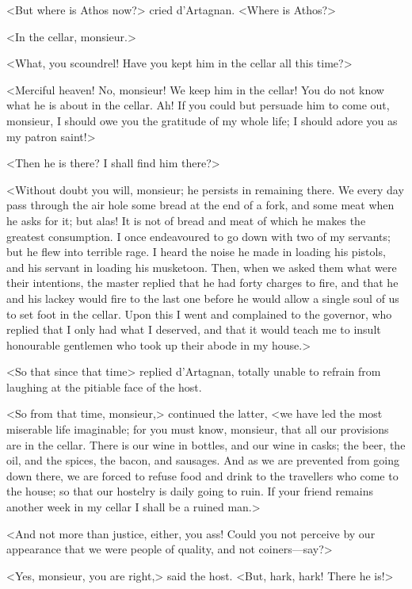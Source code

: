 <But where is Athos now?> cried d'Artagnan. <Where is Athos?> 

<In the cellar, monsieur.> 

<What, you scoundrel! Have you kept him in the cellar all this time?> 

<Merciful heaven! No, monsieur! We keep him in the cellar! You do not know what he is about in the cellar. Ah! If you could but persuade him to come out, monsieur, I should owe you the gratitude of my whole life; I should adore you as my patron saint!> 

<Then he is there? I shall find him there?> 

<Without doubt you will, monsieur; he persists in remaining there. We every day pass through the air hole some bread at the end of a fork, and some meat when he asks for it; but alas! It is not of bread and meat of which he makes the greatest consumption. I once endeavoured to go down with two of my servants; but he flew into terrible rage. I heard the noise he made in loading his pistols, and his servant in loading his musketoon. Then, when we asked them what were their intentions, the master replied that he had forty charges to fire, and that he and his lackey would fire to the last one before he would allow a single soul of us to set foot in the cellar. Upon this I went and complained to the governor, who replied that I only had what I deserved, and that it would teach me to insult honourable gentlemen who took up their abode in my house.> 

<So that since that time\longdash> replied d'Artagnan, totally unable to refrain from laughing at the pitiable face of the host. 

<So from that time, monsieur,> continued the latter, <we have led the most miserable life imaginable; for you must know, monsieur, that all our provisions are in the cellar. There is our wine in bottles, and our wine in casks; the beer, the oil, and the spices, the bacon, and sausages. And as we are prevented from going down there, we are forced to refuse food and drink to the travellers who come to the house; so that our hostelry is daily going to ruin. If your friend remains another week in my cellar I shall be a ruined man.> 

<And not more than justice, either, you ass! Could you not perceive by our appearance that we were people of quality, and not coiners---say?> 

<Yes, monsieur, you are right,> said the host. <But, hark, hark! There he is!> 


